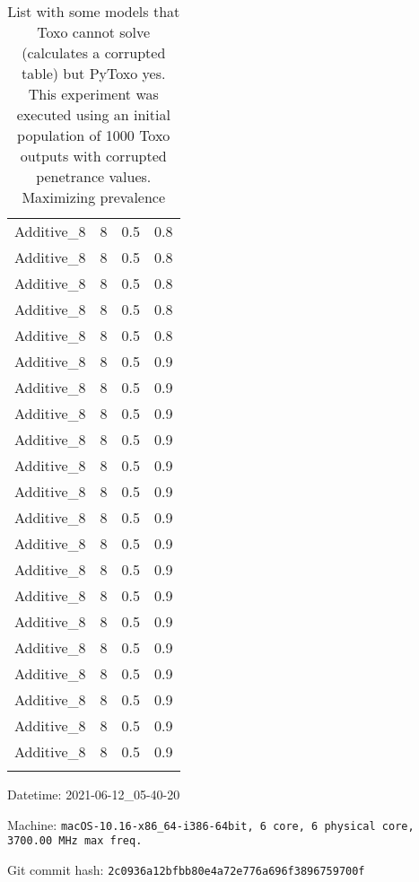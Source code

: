 \documentclass{article}
\begin{document}
\begin{longtable}[H]{lrrr}
 Additive\_8 &       8 &   0.5 &            0.8 \\
 Additive\_8 &       8 &   0.5 &            0.8 \\
 Additive\_8 &       8 &   0.5 &            0.8 \\
 Additive\_8 &       8 &   0.5 &            0.8 \\
 Additive\_8 &       8 &   0.5 &            0.8 \\
 Additive\_8 &       8 &   0.5 &            0.9 \\
 Additive\_8 &       8 &   0.5 &            0.9 \\
 Additive\_8 &       8 &   0.5 &            0.9 \\
 Additive\_8 &       8 &   0.5 &            0.9 \\
 Additive\_8 &       8 &   0.5 &            0.9 \\
 Additive\_8 &       8 &   0.5 &            0.9 \\
 Additive\_8 &       8 &   0.5 &            0.9 \\
 Additive\_8 &       8 &   0.5 &            0.9 \\
 Additive\_8 &       8 &   0.5 &            0.9 \\
 Additive\_8 &       8 &   0.5 &            0.9 \\
 Additive\_8 &       8 &   0.5 &            0.9 \\
 Additive\_8 &       8 &   0.5 &            0.9 \\
 Additive\_8 &       8 &   0.5 &            0.9 \\
 Additive\_8 &       8 &   0.5 &            0.9 \\
 Additive\_8 &       8 &   0.5 &            0.9 \\
 Additive\_8 &       8 &   0.5 &            0.9 \\
\hline

\caption{List with some models that Toxo cannot solve (calculates a corrupted table) but PyToxo yes. This experiment was executed using an initial population of 1000 Toxo outputs with corrupted penetrance values. Maximizing prevalence}
\end{longtable}
Datetime: 2021-06-12\_05-40-20

Machine: \texttt{macOS-10.16-x86\_64-i386-64bit, 6 core, 6 physical core, 3700.00 MHz max freq.}

Git commit hash: \texttt{2c0936a12bfbb80e4a72e776a696f3896759700f}
\end{document}
